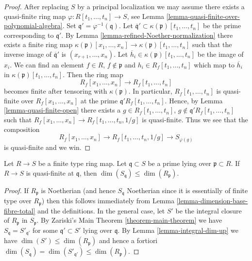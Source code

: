 \begin{proof}
After replacing $S$ by a principal localization we may assume there
exists a quasi-finite ring map $\varphi : R[t_1, \ldots, t_n] \to S$, see
Lemma \ref{lemma-quasi-finite-over-polynomial-algebra}.
Set $\mathfrak q' = \varphi^{-1}(\mathfrak q)$.
Let $\overline{\mathfrak q}' \subset \kappa(\mathfrak p)[t_1, \ldots, t_n]$
be the prime corresponding to $\mathfrak q'$. By
Lemma \ref{lemma-refined-Noether-normalization}
there exists a finite ring map
$\kappa(\mathfrak p)[x_1, \ldots, x_n] \to
\kappa(\mathfrak p)[t_1, \ldots, t_n]$
such that the inverse image of $\overline{\mathfrak q}'$ is
$(x_{r + 1}, \ldots, x_n)$. Let
$\overline{h}_i \in \kappa(\mathfrak p)[t_1, \ldots, t_n]$
be the image of $x_i$. We can find an element
$f \in R$, $f \not \in \mathfrak p$
and $h_i \in R_f[t_1, \ldots, t_n]$ which map to $\overline{h}_i$
in $\kappa(\mathfrak p)[t_1, \ldots, t_n]$. Then the ring map
$$
R_f[x_1, \ldots, x_n] \longrightarrow R_f[t_1, \ldots, t_n]
$$
becomes finite after tensoring with $\kappa(\mathfrak p)$.
In particular, $R_f[t_1, \ldots, t_n]$ is quasi-finite over
$R_f[x_1, \ldots, x_n]$ at the prime $\mathfrak q'R_f[t_1, \ldots, t_n]$.
Hence, by
Lemma \ref{lemma-quasi-finite-open}
there exists a $g \in R_f[t_1, \ldots, t_n]$,
$g \not \in \mathfrak q'R_f[t_1, \ldots, t_n]$
such that $R_f[x_1, \ldots, x_n] \to R_f[t_1, \ldots, t_n, 1/g]$
is quasi-finite. Thus we see that the composition
$$
R_f[x_1, \ldots, x_n] \longrightarrow
R_f[t_1, \ldots, t_n, 1/g] \longrightarrow S_{\varphi(g)}
$$
is quasi-finite and we win.
\end{proof}

\begin{lemma}
\label{lemma-dimension-inequality-quasi-finite}
Let $R \to S$ be a finite type ring map.
Let $\mathfrak q \subset S$ be a prime lying over $\mathfrak p \subset R$.
If $R \to S$ is quasi-finite at $\mathfrak q$, then
$\dim(S_{\mathfrak q}) \leq \dim(R_{\mathfrak p})$.
\end{lemma}

\begin{proof}
If $R_{\mathfrak p}$ is Noetherian
(and hence $S_{\mathfrak q}$ Noetherian since it is essentially of
finite type over $R_{\mathfrak p}$)
then this follows immediately from
Lemma \ref{lemma-dimension-base-fibre-total} and the
definitions. In the general case, let $S'$ be the integral
closure of $R_\mathfrak p$ in $S_\mathfrak p$.
By Zariski's Main Theorem \ref{theorem-main-theorem}
we have $S_{\mathfrak q} = S'_{\mathfrak q'}$ for some
$\mathfrak q' \subset S'$ lying over $\mathfrak q$.
By Lemma \ref{lemma-integral-dim-up} we have
$\dim(S') \leq \dim(R_\mathfrak p)$ and hence a fortiori
$\dim(S_\mathfrak q) = \dim(S'_{\mathfrak q'}) \leq \dim(R_\mathfrak p)$.
\end{proof}

